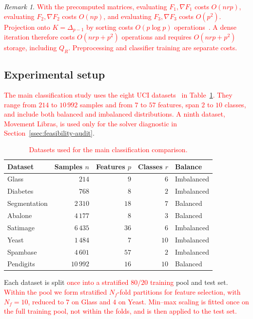 \documentclass[]{interact}
\theoremstyle{plain}
\theoremstyle{definition}
\theoremstyle{remark}
\newtheorem{remark}{Remark}
\begin{document}
\begin{remark}\label{rem:fs-cost}
\leavevmode\textcolor{red}{With the precomputed matrices, evaluating $F_1,\nabla F_1$ costs $O(nrp)$, evaluating $F_2,\nabla F_2$ costs $O(np)$, and evaluating $F_3,\nabla F_3$ costs $O(p^2)$. Projection onto $K=\Delta_{p-1}$ by sorting costs $O(p\log p)$ operations~\citep{condat2016simplex}. A dense iteration therefore costs $O(nrp+p^2)$ operations and requires $O(nrp+p^2)$ storage, including $Q_R$. Preprocessing and classifier training are separate costs.}
\end{remark}

\subsection{Experimental setup}\label{ssec:setup}\label{sssec:datasets}
\leavevmode\textcolor{red}{The main classification study uses the eight UCI datasets~\citep{kelly2023uci} in Table~\ref{tab:datasets}. They range from $214$ to $10\,992$ samples and from $7$ to $57$ features, span $2$ to $10$ classes, and include both balanced and imbalanced distributions. A ninth dataset, Movement Libras, is used only for the solver diagnostic in Section~\ref{ssec:feasibility-audit}}.

\begin{table}[htbp]
\centering
\caption{\textcolor{red}{Datasets used for the main classification comparison.}}\label{tab:datasets}
\begin{tabular}{lrrrl}
\toprule
Dataset      & Samples $n$ & Features $p$ & Classes $r$ & Balance    \\
\midrule
Glass        & $214$       & $9$          & $6$         & Imbalanced \\
Diabetes     & $768$       & $8$          & $2$         & Imbalanced \\
Segmentation & $2\,310$    & $18$         & $7$         & Balanced   \\
Abalone      & $4\,177$    & $8$          & $3$         & Balanced   \\
Satimage     & $6\,435$    & $36$         & $6$         & Imbalanced \\
Yeast        & $1\,484$    & $7$          & $10$        & Imbalanced \\
Spambase     & $4\,601$    & $57$         & $2$         & Imbalanced \\
Pendigits    & $10\,992$   & $16$         & $10$        & Balanced   \\
\bottomrule
\end{tabular}
\end{table}
Each dataset is split \leavevmode\textcolor{red}{once into a stratified $80/20$ training} pool and test set. \leavevmode\textcolor{red}{Within the pool we form stratified $N_f$-fold partitions for feature selection, with $N_f=10$, reduced to $7$ on Glass and $4$ on Yeast. Min--max scaling is fitted once on the full training pool, not within the folds, and is then applied to the test set.}
\end{document}
